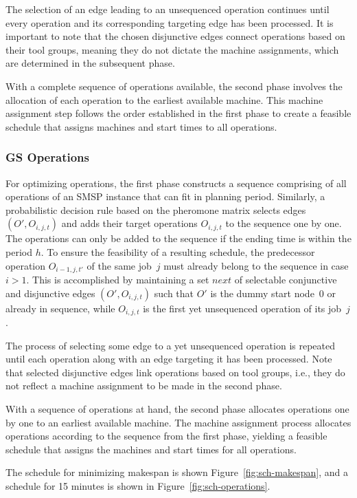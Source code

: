 The selection of an edge leading to an unsequenced operation continues until every operation and its corresponding targeting edge has been processed. It is important to note that the chosen disjunctive edges connect operations based on their tool groups, meaning they do not dictate the machine assignments, which are determined in the subsequent phase.

With a complete sequence of operations available, the second phase involves the allocation of each operation to the earliest available machine. This machine assignment step follows the order established in the first phase to create a feasible schedule that assigns machines and start times to all operations.


\subsubsection{GS Operations}
For optimizing operations, the first phase constructs a sequence comprising of all operations
of an SMSP instance that can fit in planning period.
Similarly, a probabilistic decision rule based on the pheromone
matrix selects edges $(O',O_{i,j,t})$
and adds their target operations $O_{i,j,t}$
to the sequence one by one. The operations can only be added to the sequence if the ending time is within the period $h$.
To ensure the feasibility of a resulting schedule,
the predecessor operation $O_{i-1,j,t'}$ of the same job~$j$
must already belong to the sequence in case $i>1$.
This is accomplished by maintaining a set $\mathit{next}$
of selectable conjunctive and disjunctive edges $(O',O_{i,j,t})$
such that $O'$ is the dummy start node~$0$ or already in sequence,
while $O_{i,j,t}$ is the first yet unsequenced operation of its job~$j$.

The process of selecting some edge to a yet unsequenced operation
is repeated until each operation along with an edge targeting it
has been processed.
Note that selected disjunctive edges link operations based on tool groups,
i.e., they do not reflect a machine assignment to be made in the second phase.

With a sequence of operations at hand,
the second phase allocates operations one by one to an earliest
available machine.
The machine assignment process allocates operations
according to the sequence from the first phase, yielding a
feasible schedule that assigns the machines and start times for all operations.

The schedule for minimizing makespan is shown Figure~\ref{fig:sch-makespan}, and a schedule for 15 minutes is shown in Figure~\ref{fig:sch-operations}.


